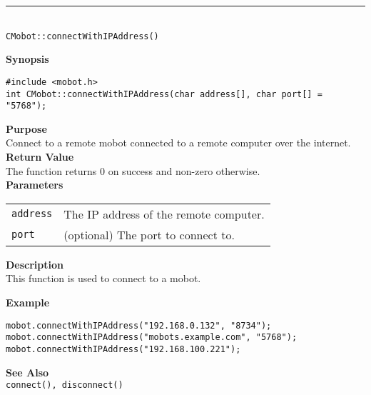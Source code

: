 \noindent
\vspace{5pt}
\rule{4.5in}{0.015in} \\
\noindent
{\LARGE \texttt{CMobot::connectWithIPAddress()}}\\
{}

\noindent
{\bf Synopsis}
\vspace{-8pt}
\begin{verbatim}
#include <mobot.h>
int CMobot::connectWithIPAddress(char address[], char port[] = "5768");
\end{verbatim}

\noindent
{\bf Purpose}\\
Connect to a remote mobot connected to a remote computer over the internet.\\

\noindent
{\bf Return Value}\\
The function returns 0 on success and non-zero otherwise.\\

\noindent
{\bf Parameters}
\vspace{-0.1in}
\begin{description}
\item               
\begin{tabular}{p{10 mm}p{145 mm}}
\texttt{address} & The IP address of the remote computer. \\
\texttt{port} & (optional) The port to connect to. \\
\end{tabular}
\end{description}

\noindent
{\bf Description}\\
This function is used to connect to a mobot. 

\noindent
{\bf Example}\\
\begin{verbatim}
mobot.connectWithIPAddress("192.168.0.132", "8734");
mobot.connectWithIPAddress("mobots.example.com", "5768");
mobot.connectWithIPAddress("192.168.100.221");
\end{verbatim}
\noindent

\noindent
{\bf See Also}\\
\texttt{connect(), disconnect()}

